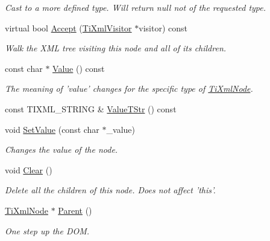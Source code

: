 \begin{DoxyCompactItemize}
\begin{DoxyCompactList}\small\item\em Cast to a more defined type. Will return null not of the requested type. \item\end{DoxyCompactList}\item 
virtual bool \hyperlink{classTiXmlDeclaration_ab6a6b178161ba9abc2c35058de689864}{Accept} (\hyperlink{classTiXmlVisitor}{TiXmlVisitor} $\ast$visitor) const 
\begin{DoxyCompactList}\small\item\em Walk the XML tree visiting this node and all of its children. \item\end{DoxyCompactList}\item 
const char $\ast$ \hyperlink{classTiXmlNode_a77943eb90d12c2892b1337a9f5918b41}{Value} () const 
\begin{DoxyCompactList}\small\item\em The meaning of 'value' changes for the specific type of \hyperlink{classTiXmlNode}{TiXmlNode}. \item\end{DoxyCompactList}\item 
const TIXML\_\-STRING \& \hyperlink{classTiXmlNode_a83ece13d2ea66dac66e0b21332229239}{ValueTStr} () const 
\item 
void \hyperlink{classTiXmlNode_a2a38329ca5d3f28f98ce932b8299ae90}{SetValue} (const char $\ast$\_\-value)
\begin{DoxyCompactList}\small\item\em Changes the value of the node. \item\end{DoxyCompactList}\item 
void \hyperlink{classTiXmlNode_a708e7f953df61d4d2d12f73171550a4b}{Clear} ()
\begin{DoxyCompactList}\small\item\em Delete all the children of this node. Does not affect 'this'. \item\end{DoxyCompactList}\item 
\hyperlink{classTiXmlNode}{TiXmlNode} $\ast$ \hyperlink{classTiXmlNode_ab643043132ffd794f8602685d34a982e}{Parent} ()
\begin{DoxyCompactList}\small\item\em One step up the DOM. \item\end{DoxyCompactList}\item 

\end{DoxyCompactItemize}
